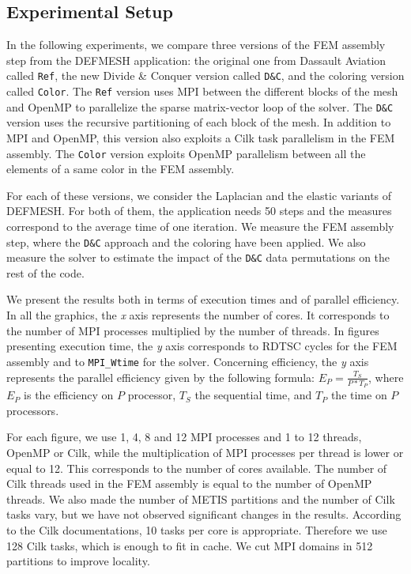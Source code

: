 \documentclass{IOS-Book-Article}
\begin{document}
\subsection{Experimental Setup}
In the following experiments, we compare three versions of the FEM assembly step from the DEFMESH application:
the original one from Dassault Aviation called  {\tt Ref}, the new Divide \& Conquer version called {\tt D\&C}, and the coloring version called {\tt Color}.
The {\tt Ref} version uses MPI between the different blocks of the mesh and OpenMP to parallelize the sparse matrix-vector loop of the solver.
The {\tt D\&C} version uses the recursive partitioning of each block of the mesh.
In addition to MPI and OpenMP, this version also exploits a Cilk task parallelism in the FEM assembly.
The {\tt Color} version exploits OpenMP parallelism between all the elements of a same color in the FEM assembly.

For each of these versions, we consider the Laplacian and the elastic variants of DEFMESH.
For both of them, the application needs 50 steps and the measures correspond to the average time of one iteration.
We measure the FEM assembly step, where the {\tt D\&C} approach and the coloring have been applied.
We also measure the solver to estimate the impact of the {\tt D\&C} data permutations on the rest of the code.

We present the results both in terms of execution times and of parallel efficiency.
In all the graphics, the \emph{x} axis represents the number of cores. It corresponds to the number of MPI processes multiplied by the number of threads.
In figures presenting execution time, the \emph{y} axis corresponds to RDTSC cycles for the FEM assembly and to \texttt{MPI\_Wtime} for the solver.
Concerning efficiency, the \emph{y} axis represents the parallel efficiency given by the following formula:
$E_{P} = \frac{T_{S}}{P*T_{P}}$, where $E_{P}$ is the efficiency on $P$ processor, $T_{S}$ the sequential time, and $T_{P}$ the time on $P$ processors.

For each figure, we use 1, 4, 8 and 12 MPI processes and 1 to 12 threads, OpenMP or Cilk, while the multiplication of MPI processes per thread is lower or equal to 12.
This corresponds to the number of cores available. The number of Cilk threads used in the FEM assembly is equal to the number of OpenMP threads.
We also made the number of METIS partitions and the number of Cilk tasks vary, but we have not observed significant changes in the results.
According to the Cilk documentations, 10 tasks per core is appropriate. Therefore we use 128 Cilk tasks, which is enough to fit in cache.
We cut MPI domains in 512 partitions to improve locality.
\end{document}
